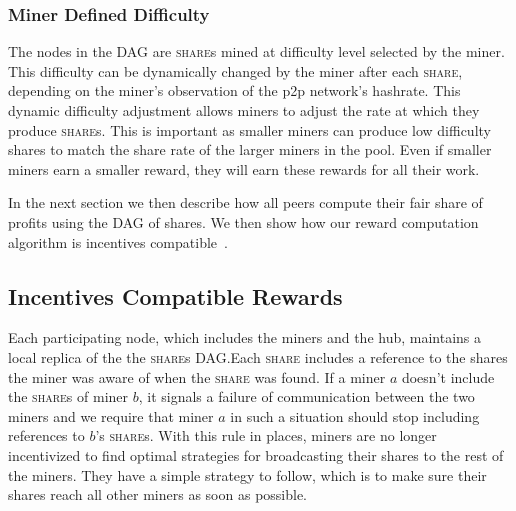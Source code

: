 \documentclass{article}
\begin{document}
\subsubsection{Miner Defined Difficulty}\label{sec:share-difficulty}

The nodes in the DAG are \textsc{share}s mined at difficulty level
selected by the miner. This difficulty can be dynamically changed by
the miner after each \textsc{share}, depending on the miner's
observation of the p2p network's hashrate. This dynamic difficulty
adjustment allows miners to adjust the rate at which they produce
\textsc{share}s. This is important as smaller miners can produce low
difficulty shares to match the share rate of the larger miners in the
pool. Even if smaller miners earn a smaller reward, they will earn
these rewards for all their work.

In the next section we then describe how all peers compute their fair
share of profits using the DAG of shares. We then show how our reward
computation algorithm is incentives
compatible~\cite{incentives-compatible}.

  
  
\subsection{Incentives Compatible Rewards}\label{sec:rewards}

Each participating node, which includes the miners and the hub,
maintains a local replica of the the \textsc{share}s DAG.\@ Each
\textsc{share} includes a reference to the shares the miner was aware
of when the \textsc{share} was found. If a miner $a$ doesn't include
the \textsc{share}s of miner $b$, it signals a failure of
communication between the two miners and we require that miner $a$ in
such a situation should stop including references to $b$'s
\textsc{share}s. With this rule in places, miners are no longer
incentivized to find optimal strategies for broadcasting their shares
to the rest of the miners. They have a simple strategy to follow,
which is to make sure their shares reach all other miners as soon as
possible.
\end{document}

